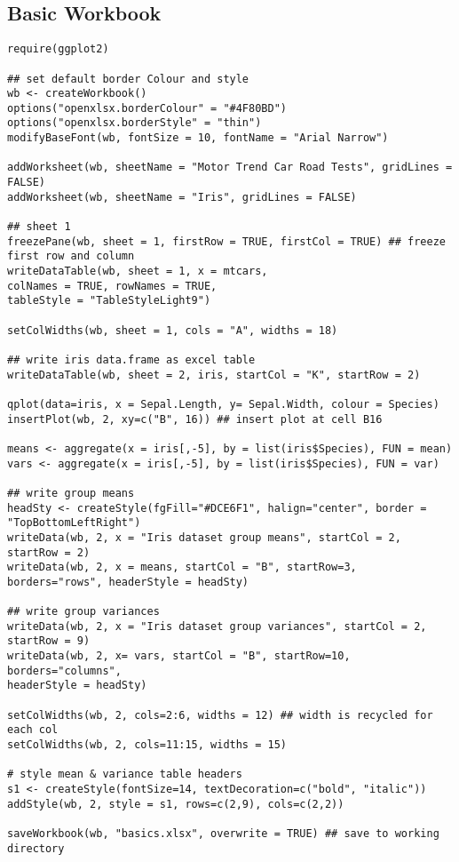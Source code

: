\documentclass[11pt]{article}\usepackage[]{graphicx}\usepackage[]{color}
\begin{document}
\subsection{Basic Workbook}
\begin{verbatim}
require(ggplot2)

## set default border Colour and style
wb <- createWorkbook()
options("openxlsx.borderColour" = "#4F80BD")
options("openxlsx.borderStyle" = "thin")
modifyBaseFont(wb, fontSize = 10, fontName = "Arial Narrow")

addWorksheet(wb, sheetName = "Motor Trend Car Road Tests", gridLines = FALSE)
addWorksheet(wb, sheetName = "Iris", gridLines = FALSE)

## sheet 1
freezePane(wb, sheet = 1, firstRow = TRUE, firstCol = TRUE) ## freeze first row and column
writeDataTable(wb, sheet = 1, x = mtcars,
colNames = TRUE, rowNames = TRUE,
tableStyle = "TableStyleLight9")

setColWidths(wb, sheet = 1, cols = "A", widths = 18)

## write iris data.frame as excel table
writeDataTable(wb, sheet = 2, iris, startCol = "K", startRow = 2)

qplot(data=iris, x = Sepal.Length, y= Sepal.Width, colour = Species)
insertPlot(wb, 2, xy=c("B", 16)) ## insert plot at cell B16

means <- aggregate(x = iris[,-5], by = list(iris$Species), FUN = mean)
vars <- aggregate(x = iris[,-5], by = list(iris$Species), FUN = var)

## write group means
headSty <- createStyle(fgFill="#DCE6F1", halign="center", border = "TopBottomLeftRight")
writeData(wb, 2, x = "Iris dataset group means", startCol = 2, startRow = 2)
writeData(wb, 2, x = means, startCol = "B", startRow=3, borders="rows", headerStyle = headSty)

## write group variances
writeData(wb, 2, x = "Iris dataset group variances", startCol = 2, startRow = 9)
writeData(wb, 2, x= vars, startCol = "B", startRow=10, borders="columns",
headerStyle = headSty)

setColWidths(wb, 2, cols=2:6, widths = 12) ## width is recycled for each col
setColWidths(wb, 2, cols=11:15, widths = 15)

# style mean & variance table headers
s1 <- createStyle(fontSize=14, textDecoration=c("bold", "italic"))
addStyle(wb, 2, style = s1, rows=c(2,9), cols=c(2,2))

saveWorkbook(wb, "basics.xlsx", overwrite = TRUE) ## save to working directory
\end{verbatim}
\end{document}
